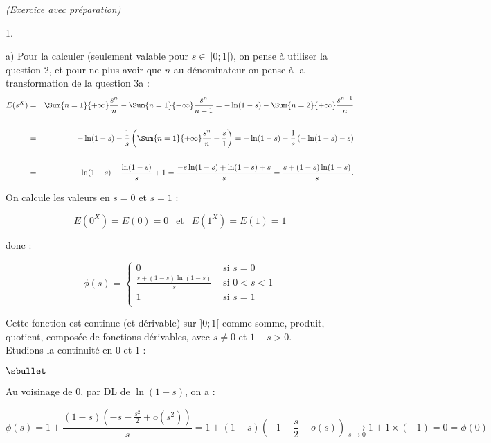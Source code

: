 \documentclass[11pt]{article}%
\begin{document}
\begin{exercice}{\it (Exercice avec préparation)}
\begin{noliste}{1.}
\begin{noliste}{a)}
 Pour la calculer (seulement valable pour $s \in \ ]0 ; 1[$), on pense
à utiliser la question 2, et pour ne plus avoir que $n$ au dénominateur
on pense à la transformation de la question 3a : 
 \begin{eqnarray*}
 E ( s^{X} ) & = & \Sum{ n = 1 }{ + \infty } \frac{ s^{n} }{ n } -
\Sum{ n = 1 }{ + \infty } \frac{ s^{n} }{ n + 1 } = - \ln (1-s) - \Sum{
n = 2 }{ + \infty } \frac{ s^{n-1} }{ n } \\
\\
 & = & - \ln (1-s) - \frac{1}{s} \left( \Sum{ n = 1 }{ + \infty }
\frac{ s^{n} }{ n } - \frac{ s }{ 1 } \right) = - \ln (1-s) -
\frac{1}{s} \left( - \ln (1-s) - s \right) \\
\\
 & = & - \ln (1-s) + \frac{ \ln (1-s) }{ s} + 1 = \frac{ - s \ln (1-s)
+ \ln (1-s) + s }{ s } = \frac{ s + (1-s) \ln (1-s) }{ s }. 
 \end{eqnarray*}

 \item On calcule les valeurs en $s = 0$ et $s = 1$ : 
 
\[
 E ( 0^{X} ) = E (0 ) = 0 \ \ \text{ et } \ \ E ( 1^{X} ) = E (1) = 1 
\]



 donc : 
 
\[
 \phi (s) = \left\{\begin{array}{cl}
 0 & \text{ si } s = 0 \\
\frac{ s + (1-s) \ln (1-s) }{ s } & \text{ si } 0 < s < 1 \\
1 & \text{ si } s = 1 \\
\end{array}
\right. 
\]

 Cette fonction est continue (et dérivable) sur $]0;1[$ comme somme,
produit, quotient, composée de fonctions dérivables, avec $s \neq 0$ et
$1-s > 0$. \\

 Etudions la continuité en 0 et 1 : \\
\begin{noliste}{$\sbullet$}

 \item Au voisinage de 0, par DL de $\ln (1-s)$, on a : 
 
\[
 \phi (s) = 1 + \frac{ (1-s) \left( -s - \frac{ s^{2} }{ 2 } + o (
s^{2} ) \right) }{ s } = 1 + (1-s ) \left(- 1 - \frac{ s }{ 2 } + o(s)
\right) \xrightarrow[ s \rightarrow 0]{} 1 + 1 \times (-1) = 0 = \phi
(0) 
\]


\end{noliste}
\end{noliste}
\end{noliste}
\end{exercice}
\end{document}
